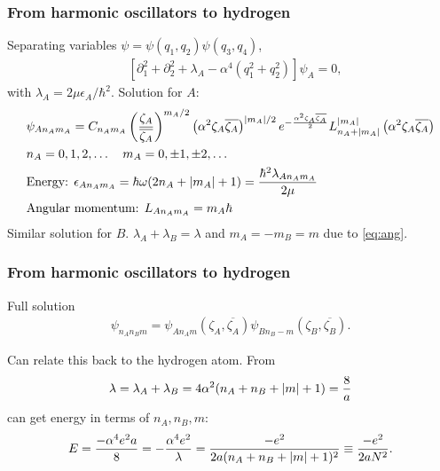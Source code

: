 \documentclass{beamer}
\theoremstyle{definition}
\newcommand{\lp}{\left(}
\newcommand{\rp}{\right)}
\newcommand{\p}{\partial}
\newcommand{\f}[2]{\frac{#1}{#2}}
\newcommand{\al}{\alpha}
\begin{document}
\begin{frame}
	\frametitle{From harmonic oscillators to hydrogen}
	
	Separating variables $\psi = \psi(q_1, q_2) \psi(q_3, q_4)$, 
	\begin{align*}
	&[\p_1^2 + \p_2^2 + \lambda_A - \al^4(q_1^2 + q_2^2)]\psi_A = 0,
	\end{align*}
	with $\lambda_A = 2\mu \epsilon_A / \hbar^2$. Solution for $A$: 
	\begin{align*}
	&\psi_{A n_A m_A}  = C_{n_Am_A} \lp \f{\zeta_A }{\overline{\zeta_A}} \rp^{{m_A}/2}  
	\lp\al^2 \zeta_A \overline{\zeta_A}\rp^{\abs{m_A}/2}e^{ -\f{\al^2 \zeta_A \overline{\zeta_A}}{2} } 
	L_{n_A + \abs{m_A}}^{\abs{m_A}} \lp \al^2 \zeta_A \overline{\zeta_A} \rp\\
	&n_A = 0,1,2,\dots \quad 
	m_A = 0, \pm 1, \pm 2, \dots  \\ 
	&\text{Energy: } \epsilon_{A n_A m_A} = \hbar \omega(2n_A + \abs{m_A} + 1) = \f{\hbar^2 \lambda_{An_A m_A}}{2\mu}\\
	&\text{Angular momentum: } L_{A n_A m_A} = m_A \hbar 
	\end{align*}
	Similar solution for $B$. $\lambda_A + \lambda_B = \lambda$ and $m_A = -m_B = m$ due to \eqref{eq:ang}.
\end{frame}



\begin{frame}
\frametitle{From harmonic oscillators to hydrogen}

Full solution
\begin{align*}
\psi_{n_A n_B m} = \psi_{An_A m}\lp \zeta_A, \overline{\zeta_A}\rp \psi_{Bn_B- m}\lp \zeta_B, \overline{\zeta_B} \rp.
\end{align*}

Can relate this back to the hydrogen atom. From 
\begin{align*}
\lambda = \lambda_A + \lambda_B =  4\al^2 (n_A + n_B + \abs{m} + 1) = \f{8}{a}
\end{align*}
can get energy in terms of $n_A, n_B, m$:
\begin{align*}
E = \f{-\al^4 e^2 a}{8} = -\f{\al^4 e^2 }{\lambda} = \f{-e^2 }{2a(n_A + n_B + \abs{m} + 1)^2} \equiv \f{-e^2}{2aN^2}.
\end{align*}


\end{frame}
\end{document}
